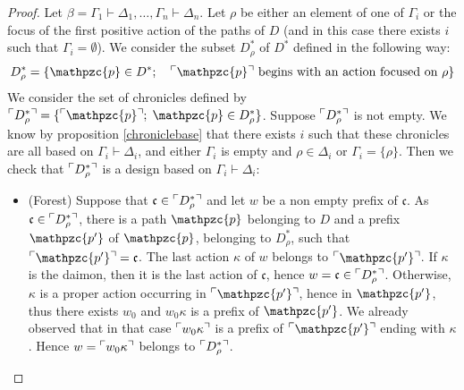 \documentclass{LMCS}
\newcommand{\chronicle}[1]{{\mathfrak{#1}}}
\newcommand{\design}[1]{{\mathfrak{#1}}}
\newcommand{\pathLL}[1]{\mathpzc{#1}}\newcommand{\strategy}[1]{\pathLL{#1}}\newcommand{\view}[1]{\raisebox{.3ex}{$\ulcorner$}{#1}\raisebox{.3ex}{$\urcorner$}}\newcommand{\fullview}[1]{\raisebox{.3ex}{$\ulcorner\mkern-6mu\ulcorner\mkern-2mu$}{#1}\raisebox{.3ex}{$\mkern-2mu\urcorner\mkern-6mu\urcorner$}}\newcommand{\views}[1]{\view{#1}}\newcommand{\fullviews}[1]{\fullview{#1}}\newcommand{\shuffle}[1]{\llcorner\design{#1}\lrcorner}\newcommand{\PoD}[1]{{\mathcal{P}}_{#1}}\newcommand{\norm}[1]{\llbracket\design{#1}\rrbracket}
\begin{document}
 \begin{proof}
Let $\beta = \Gamma_1\vdash \Delta_1, \dots, \Gamma_n\vdash \Delta_n$.
Let $\rho$ be either an element of one of $\Gamma_i$ or the focus of the first positive action of the paths of $D$ (and in this case there exists $i$ such that $\Gamma_i = \emptyset$). We consider the subset $D^*_\rho$ of $D^*$ defined in the following way: 
\[
D^*_\rho
=\{ \pathLL{p}\in D^*;\quad\view{\pathLL{p}}\mbox{ begins with an action focused on  }\rho\}
\] 
 We consider the set of chronicles defined by  $\views{D^*_\rho}=\{ \views{\pathLL{p}};\; \pathLL{p}\in D^*_\rho\}$.
Suppose $\views{D^*_\rho}$ is not empty. We know by proposition \ref{chroniclebase} that there exists $i$ such that these chronicles are all based on $\Gamma_i\vdash\Delta_i$, and either $\Gamma_i$ is empty and $\rho\in\Delta_i$ or $\Gamma_i = \{\rho\}$.
 Then  we check that $\views{D^*_\rho}$ is a design based on $\Gamma_i\vdash\Delta_i$:
\begin{itemize}
\item (Forest) Suppose that $\chronicle{c}\in \views{D^*_{\rho}}$ and let $w$ be a non empty prefix of $\chronicle{c}$. As $\chronicle{c}\in \views{D^*_{\rho}}$, there is a path $\pathLL{p}$ belonging to $D$ and a prefix  $\pathLL{p'}$ of $\pathLL{p}$, belonging to $D^*_\rho$, such that $\view{\pathLL{p'}}=\chronicle{c}$. The last action $\kappa$ of $w$ belongs to $\view{\pathLL{p'}}$. 
If $\kappa$ is the daimon, then it is the last action of $\chronicle{c}$, hence $w= \chronicle{c} \in \views{D^*_{\rho}}$.
Otherwise, $\kappa$ is a proper action occurring in $\view{\pathLL{p'}}$, hence in $\pathLL{p'}$, thus there exists $w_0$ and $w_0\kappa$ is a prefix of $\pathLL{p'}$. We already observed that in that case $\view{w_0\kappa}$ is a prefix of $\view{\pathLL{p'}}$ ending with $\kappa$. Hence $w=\view{w_0\kappa}$ belongs to $\views{D^*_{\rho}}$. 


\end{itemize}
\end{proof}
\end{document}
